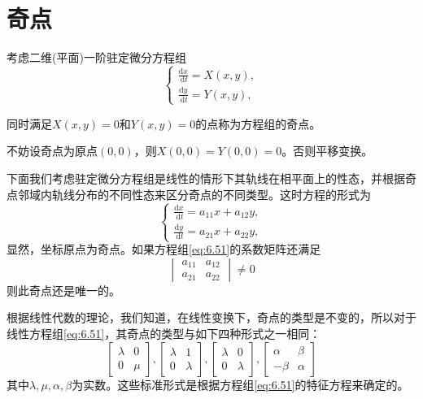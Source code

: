 \section{奇点}

考虑二维(平面)一阶驻定微分方程组
\begin{equation}\label{eq:6.50}
    \begin{cases}
        \frac{\mathrm{d} x}{\mathrm{~d} t}=X(x, y), \\
        \frac{\mathrm{d} y}{\mathrm{~d} t}=Y(x, y),
    \end{cases}
\end{equation}
\begin{definition}[奇点]
    同时满足$X(x,y)=0$和$Y(x,y)=0$的点称为方程组的奇点。
\end{definition}
不妨设奇点为原点$(0,0)$，则$X(0,0)=Y(0,0)=0$。否则平移变换。

下面我们考虑驻定微分方程组是线性的情形下其轨线在相平面上的性态，并根据奇点邻域内轨线分布的不同性态来区分奇点的不同类型。这时方程的形式为
\begin{equation}\label{eq:6.51}
    \begin{cases}
        \frac{\mathrm{d} x}{\mathrm{~d} t}=a_{11}x+a_{12}y, \\
        \frac{\mathrm{d} y}{\mathrm{~d} t}=a_{21}x+a_{22}y,
    \end{cases}
\end{equation}
显然，坐标原点为奇点。如果方程组\ref{eq:6.51}的系数矩阵还满足
\[
    \begin{vmatrix}
        a_{11} & a_{12} \\
        a_{21} & a_{22}
    \end{vmatrix}\ne 0
\]
则此奇点还是唯一的。

根据线性代数的理论，我们知道，在线性变换下，奇点的类型是不变的，所以对于线性方程组\ref{eq:6.51}，其奇点的类型与如下四种形式之一相同：
\[
    \left[\begin{array}{ll}\lambda & 0 \\ 0 & \mu\end{array}\right],\left[\begin{array}{ll}\lambda & 1 \\ 0 & \lambda\end{array}\right],\left[\begin{array}{ll}\lambda & 0 \\ 0 & \lambda\end{array}\right],\left[\begin{array}{rr}\alpha & \beta \\ -\beta & \alpha\end{array}\right]
\]
其中$\lambda,\mu,\alpha,\beta$为实数。这些标准形式是根据方程组\ref{eq:6.51}的特征方程来确定的。
